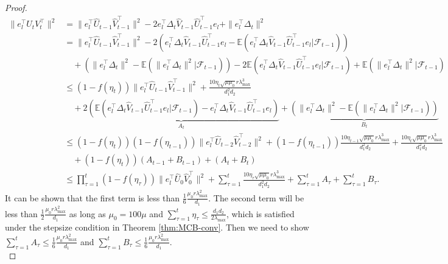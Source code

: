 \documentclass[12pt]{article}
\def\EE{{\mathbb E}}
\theoremstyle{plain}
\begin{document}
\begin{proof}
\begin{align*}
    \|e_l^{\top}U_tV_t^{\top}\|^2 &= \|e_l^{\top}\widehat{U}_{t-1}\widehat{V}_{t-1}^{\top}\|^2 - 2e_l^{\top}\Delta_{t}\widehat{V}_{t-1}\widehat{U}_{t-1}^{\top}e_l +\|e_l^{\top}\Delta_{t}\|^2\\
	& = \|e_l^{\top}\widehat{U}_{t-1}\widehat{V}_{t-1}^{\top}\|^2 - 2(e_l^{\top}\Delta_{t}\widehat{V}_{t-1}\widehat{U}_{t-1}^{\top}e_l -\EE(e_l^{\top}\Delta_{t}\widehat{V}_{t-1}\widehat{U}_{t-1}^{\top}e_l|\mathcal{F}_{t-1})) \\
	&\quad +(\|e_l^{\top}\Delta_{t}\|^2 - \EE(\|e_l^{\top}\Delta_{t}\|^2|\mathcal{F}_{t-1})) - 2\EE(e_l^{\top}\Delta_{t}\widehat{V}_{t-1}\widehat{U}_{t-1}^{\top}e_l|\mathcal{F}_{t-1}) + \EE( \|e_l^{\top}\Delta_{t}\|^2|\mathcal{F}_{t-1})\\
	&\leq (1-f(\eta_t))\|e_l^{\top}\widehat{U}_{t-1}\widehat{V}_{t-1}^{\top}\|^2 + \frac{10\eta_t\sqrt{\mu\mu_0} r\lambda_{\max}^3}{d_1^2d_2}  \\
	&\quad + \underbrace{2(\EE(e_l^{\top}\Delta_{t}\widehat{V}_{t-1}\widehat{U}_{t-1}^{\top}e_l|\mathcal{F}_{t-1}) -e_l^{\top}\Delta_{t}\widehat{V}_{t-1}\widehat{U}_{t-1}^{\top}e_l)}_{A_{t}} +\underbrace{(\|e_l^{\top}\Delta_{t}\|^2 - \EE(\|e_l^{\top}\Delta_{t}\|^2|\mathcal{F}_{t-1}))}_{B_{t}} \\
    &\leq (1-f(\eta_t))(1-f(\eta_{t-1}))\|e_l^{\top}\widehat{U}_{t-2}\widehat{V}_{t-2}^{\top}\|^2 + (1-f(\eta_{t-1}))\frac{10\eta_{t-1}\sqrt{\mu\mu_0} r\lambda_{\max}^3}{ d_1^2d_2} + \frac{10\eta_t\sqrt{\mu\mu_0} r\lambda_{\max}^3}{d_1^2d_2} \\
    &\quad + (1-f(\eta_t))(A_{t-1}+B_{t-1})+(A_{t}+B_{t}) \\
    &\leq  \prod_{\tau=1}^{t}(1-f(\eta_{\tau})) \|e_l^{\top}\widehat{U}_{0}\widehat{V}_0^{\top}\|^2 +  \sum_{\tau=1}^{t}\frac{10\eta_{\tau}\sqrt{\mu\mu_0} r\lambda_{\max}^3}{d_1^2d_2}  + \sum_{\tau=1}^{t}A_{\tau} + \sum_{\tau=1}^{t}B_{\tau}.
\end{align*}
It can be shown that the first term is less than $\frac{1}{6}\frac{\mu_0r\lambda_{\max}^2}{d_1}$. The second term will be less than $\frac{1}{2}\frac{\mu_0r\lambda_{\max}^2}{d_1}$ as long as $\mu_0=100\mu$ and $\sum_{\tau=1}^{t}\eta_{\tau}\leq \frac{d_1d_2}{2\lambda_{\max}}$, which is satisfied under the stepsize condition in Theorem \ref{thm:MCB-conv}. Then we need to show $\sum_{\tau=1}^{t}A_{\tau}\leq \frac{1}{6}\frac{\mu_0r\lambda_{\max}^2}{d_1}$ and $\sum_{\tau=1}^{t}B_{\tau}\leq \frac{1}{6}\frac{\mu_0r\lambda_{\max}^2}{d_1}$.\\

\end{proof}
\end{document}
